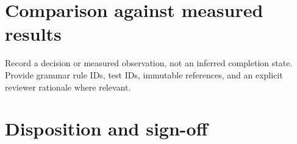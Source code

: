 \documentclass[11pt,letterpaper]{article}
\begin{document}
\section{Comparison against measured results}
Record a decision or measured observation, not an inferred completion state. Provide grammar rule IDs, test IDs, immutable references, and an explicit reviewer rationale where relevant.
\section{Disposition and sign-off}
\end{document}
